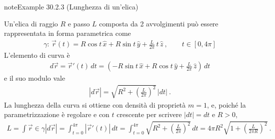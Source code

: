 \documentclass[letterpaper,10pt,italian]{jupyterBook}
\begin{document}
\begin{sphinxadmonition}{note}{Example 30.2.3 (Lunghezza di un’elica)}



\sphinxAtStartPar
Un’elica di raggio \(R\) e passo \(L\) composta da 2 avvolgimenti può essere rappresentata in forma parametrica come
\begin{equation*}
\begin{split}\gamma: \, \vec{r}(t) = R \cos t \, \hat{x} + R \sin t \, \hat{y} + \frac{L}{2\pi} \, t \, \hat{z} \ , \qquad t \in \left[ 0, 4 \pi \right]\end{split}
\end{equation*}
\sphinxAtStartPar
L’elemento di curva è
\begin{equation*}
\begin{split}d \vec{r} = \vec{r}'(t) \, dt = \left( - R \sin t \, \hat{x} + R \cos t \, \hat{y} + \frac{L}{2\pi} \, \hat{z} \right) \, dt \end{split}
\end{equation*}
\sphinxAtStartPar
e il suo modulo vale
\begin{equation*}
\begin{split}|d \vec{r}| = \sqrt{ R^2 + \left(\frac{L}{2 \pi}\right)^2 } \, |dt| \ .\end{split}
\end{equation*}
\sphinxAtStartPar
La lunghezza della curva si ottiene con densità di proprietà \(m = 1\),  e, poiché la parametrizzazione è regolare e con \(t\) crescente per scrivere \(|d t| = d t\) e \(R > 0\),
\begin{equation*}
\begin{split}L = \int{\vec{r}\in \gamma} |d \vec{r}| =\int_{t = 0}^{4 \pi} \left|\vec{r}'(t)\right| \, dt =  \int_{t = 0}^{4 \pi}  \sqrt{ R^2 + \left(\frac{L}{2 \pi}\right)^2 } \,  dt = 4 \pi R^2 \sqrt{1 + \left( \frac{L}{2 \pi R}\right)^2}  \ . \end{split}
\end{equation*}\end{sphinxadmonition}
\label{ch/vector-calculus/integrals:vector-integrals-ex-helix-mass}
\end{document}
